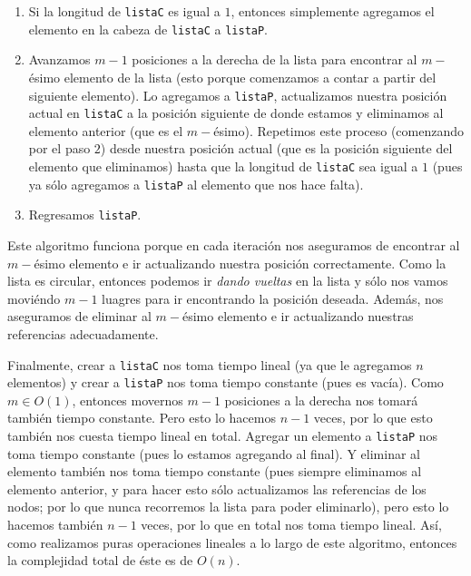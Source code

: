 \documentclass[letterpaper,11pt]{article}
\begin{document}
\begin{enumerate}
\begin{enumerate}
\begin{enumerate}
            \item Si la longitud de \texttt{listaC} es igual a $1$, entonces 
            simplemente agregamos el elemento en la cabeza de \texttt{listaC} a
            \texttt{listaP}. 

            \item Avanzamos $m-1$ posiciones a la derecha de la lista para 
            encontrar al $m-$ésimo elemento de la lista (esto porque comenzamos 
            a contar a partir del siguiente elemento). Lo agregamos a 
            \texttt{listaP}, actualizamos nuestra posición actual en 
            \texttt{listaC} a la posición siguiente de donde estamos y eliminamos 
            al elemento anterior (que es el $m-$ésimo). Repetimos este proceso 
            (comenzando por el paso $2$) desde nuestra posición actual (que es 
            la posición siguiente del elemento que eliminamos) hasta que la 
            longitud de \texttt{listaC} sea igual a $1$ (pues ya sólo agregamos 
            a \texttt{listaP} al elemento que nos hace falta).

            \item Regresamos \texttt{listaP}.
        \end{enumerate}

        Este algoritmo funciona porque en cada iteración nos aseguramos de 
        encontrar al $m-$ésimo elemento e ir actualizando nuestra posición 
        correctamente. Como la lista es circular, entonces podemos ir 
        \textit{dando vueltas} en la lista y sólo nos vamos moviéndo $m-1$ 
        luagres para ir encontrando la posición deseada. Además, nos aseguramos
        de eliminar al $m-$ésimo elemento e ir actualizando nuestras referencias 
        adecuadamente. 

        Finalmente, crear a \texttt{listaC} nos toma tiempo lineal (ya que le 
        agregamos $n$ elementos) y crear a \texttt{listaP} nos toma tiempo 
        constante (pues es vacía). Como $m \in O(1)$, entonces movernos $m-1$ 
        posiciones a la derecha nos tomará también tiempo constante. Pero esto 
        lo hacemos $n-1$ veces, por lo que esto también nos cuesta tiempo lineal 
        en total. Agregar un elemento a \texttt{listaP} nos toma tiempo constante
        (pues lo estamos agregando al final). Y eliminar al elemento también nos 
        toma tiempo constante (pues siempre eliminamos al elemento anterior, y 
        para hacer esto sólo actualizamos las referencias de los nodos; por lo 
        que nunca recorremos la lista para poder eliminarlo), pero esto lo hacemos 
        también $n-1$ veces, por lo que en total nos toma tiempo lineal. Así, como 
        realizamos puras operaciones lineales a lo largo de este algoritmo, 
        entonces la complejidad total de éste es de $O(n)$.


\end{enumerate}
\end{enumerate}
\end{document}
